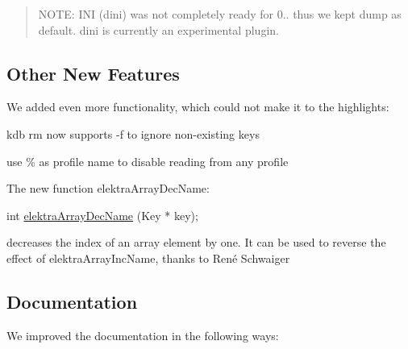 \begin{quote}
N\+O\+TE\+: I\+NI (dini) was not completely ready for 0.. thus we kept {\ttfamily dump} as default. {\ttfamily dini} is currently an experimental plugin. \end{quote}


\subsection*{Other New Features}

We added even more functionality, which could not make it to the highlights\+:


\begin{DoxyItemize}
\item {\ttfamily kdb rm} now supports {\ttfamily -\/f} to ignore non-\/existing keys
\item use {\ttfamily \%} as profile name to disable reading from any profile
\item The new function {\ttfamily elektra\+Array\+Dec\+Name}\+:
\end{DoxyItemize}


\begin{DoxyCode}
\textcolor{keywordtype}{int} \hyperlink{array_8c_a4376537e9d6545dd26afe0c6c62dd9ed}{elektraArrayDecName} (Key * key);
\end{DoxyCode}


decreases the index of an array element by one. It can be used to reverse the effect of {\ttfamily elektra\+Array\+Inc\+Name}, thanks to René Schwaiger

\subsection*{Documentation}

We improved the documentation in the following ways\+:


